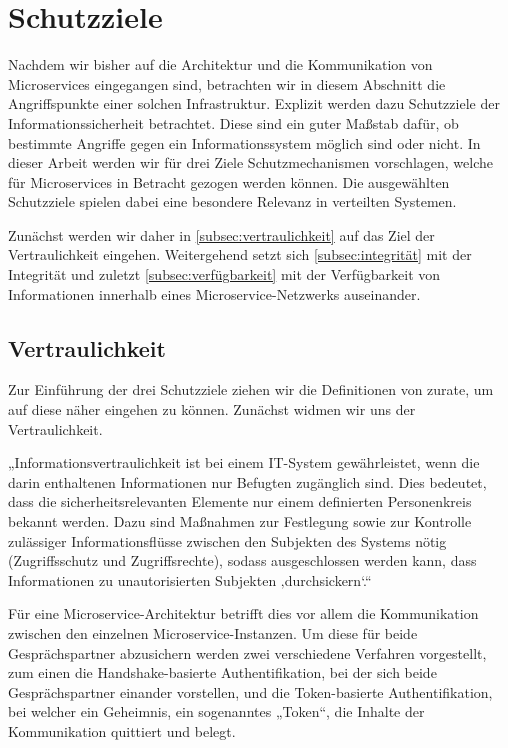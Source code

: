 \section{Schutzziele}
\label{sec:schutzziele}

Nachdem wir bisher auf die Architektur und die Kommunikation von Microservices eingegangen sind, betrachten wir in diesem Abschnitt die Angriffspunkte einer solchen Infrastruktur. Explizit werden dazu Schutzziele der Informationssicherheit betrachtet. Diese sind ein guter Maßstab dafür, ob bestimmte Angriffe gegen ein Informationssystem möglich sind oder nicht. In dieser Arbeit werden wir für drei Ziele Schutzmechanismen vorschlagen, welche für Microservices in Betracht gezogen werden können. Die ausgewählten Schutzziele spielen dabei eine besondere Relevanz in verteilten Systemen. 

Zunächst werden wir daher in \autoref{subsec:vertraulichkeit} auf das Ziel der Vertraulichkeit eingehen. Weitergehend setzt sich \autoref{subsec:integrität} mit der Integrität und zuletzt \autoref{subsec:verfügbarkeit} mit der Verfügbarkeit von Informationen innerhalb eines Microservice-Netzwerks auseinander.


\subsection{Vertraulichkeit}
\label{subsec:vertraulichkeit}

Zur Einführung der drei Schutzziele ziehen wir die Definitionen von \citeauthor{Bedner+10} zurate, um auf diese näher eingehen zu können. Zunächst widmen wir uns der Vertraulichkeit.

„Informationsvertraulichkeit ist bei einem IT-System gewährleistet, wenn die darin enthaltenen Informationen nur Befugten zugänglich sind. Dies bedeutet, dass die sicherheitsrelevanten Elemente nur einem definierten Personenkreis bekannt werden. Dazu sind Maßnahmen zur Festlegung sowie zur Kontrolle zulässiger Informationsflüsse zwischen den Subjekten des Systems nötig (Zugriffsschutz und Zugriffsrechte), sodass ausgeschlossen werden kann, dass Informationen zu unautorisierten Subjekten ‚durchsickern‘.“ \cite{Bedner+10}

Für eine Microservice-Architektur betrifft dies vor allem die Kommunikation zwischen den einzelnen Microservice-Instanzen. Um diese für beide Gesprächspartner abzusichern werden zwei verschiedene Verfahren vorgestellt, zum einen die Handshake-basierte Authentifikation, bei der sich beide Gesprächspartner einander vorstellen, und die Token-basierte Authentifikation, bei welcher ein Geheimnis, ein sogenanntes „Token“, die Inhalte der Kommunikation quittiert und belegt.


